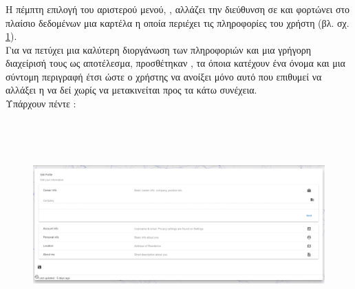 \subsubsection*{}
\pSpace Η πέμπτη επιλογή του αριστερού μενού, , αλλάζει την διεύθυνση σε  και φορτώνει στο πλαίσιο δεδομένων μια καρτέλα η οποία περιέχει τις πληροφορίες του χρήστη (βλ. σχ. \ref{fig:userProfile}).\\
\pSpace Για να πετύχει μια καλύτερη διοργάνωση των πληροφοριών και μια γρήγορη διαχείρισή τους ως αποτέλεσμα, προσθέτηκαν , τα όποια κατέχουν ένα όνομα και μια σύντομη περιγραφή έτσι ώστε ο χρήστης να ανοίξει μόνο αυτό που επιθυμεί να αλλάξει η να δεί χωρίς να μετακινείται προς τα κάτω συνέχεια.\\
\pSpace Υπάρχουν πέντε :\\

\begin{figure}[!htb]
\includegraphics[width=\columnwidth, height=8cm]{images/userProfile.png}
\caption{}
\label{fig:userProfile}
\end{figure}

